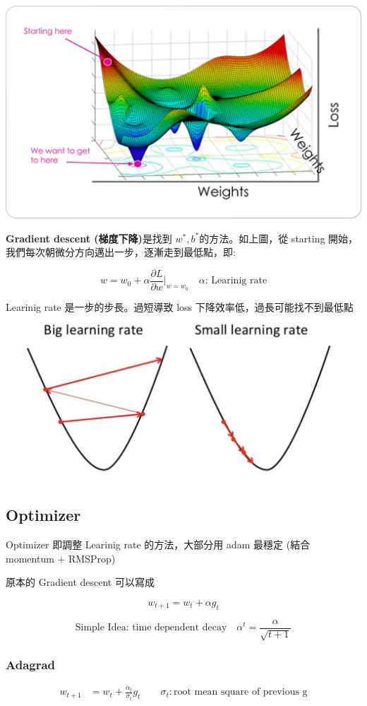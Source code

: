 \includegraphics[width=.6\textwidth]{paste_src/2025-03-20-03-16-44.png}

\textbf{Gradient descent (梯度下降)}是找到 $w^*, b^*$的方法。如上圖，從 starting 開始，我們每次朝微分方向邁出一步，逐漸走到最低點，即:

$$w = w_0+\alpha\frac{\partial L}{\partial w}|_{w=w_0} \quad\alpha \mbox{: Learinig rate}$$

Learinig rate 是一步的步長。過短導致 loss 下降效率低，過長可能找不到最低點
\includegraphics[width=.6\textwidth]{paste_src/2025-03-20-05-09-19.png}

\subsection{Optimizer}
Optimizer 即調整 Learinig rate 的方法，大部分用 adam 最穩定 (結合 momentum + RMSProp)

原本的 Gradient descent 可以寫成 

$$ 
w_{t+1}= w_t + \alpha g_t 
$$

$$
\mbox{Simple Idea: time dependent decay} \quad \alpha^t = \frac{\alpha}{\sqrt{t+1}}
$$






\subsubsection*{Adagrad} 

\begin{align}
  w_{t+1} &= w_t + \frac{\alpha_t}{\sigma_t} g_t \qquad \sigma_t: \mbox{root mean square of previous g}
\end{align}

